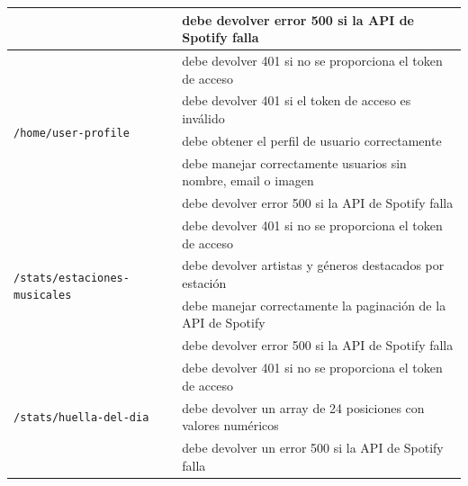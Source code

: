 \begin{longtable}{|p{5cm}|p{9cm}|}
                                                        & debe devolver error 500 si la API de Spotify falla                                       \\ \hline
  \multirow{5}{*}{\texttt{/home/user-profile}}          & debe devolver 401 si no se proporciona el token de acceso                                \\ \cline{2-2}
                                                        & debe devolver 401 si el token de acceso es inválido                                      \\ \cline{2-2}
                                                        & debe obtener el perfil de usuario correctamente                                          \\ \cline{2-2}
                                                        & debe manejar correctamente usuarios sin nombre, email o imagen                           \\ \cline{2-2}
                                                        & debe devolver error 500 si la API de Spotify falla                                       \\ \hline
  \multirow{4}{*}{\texttt{/stats/estaciones-musicales}} & debe devolver 401 si no se proporciona el token de acceso                                \\ \cline{2-2}
                                                        & debe devolver artistas y géneros destacados por estación                                 \\ \cline{2-2}
                                                        & debe manejar correctamente la paginación de la API de Spotify                            \\ \cline{2-2}
                                                        & debe devolver error 500 si la API de Spotify falla                                       \\ \hline
  \multirow{3}{*}{\texttt{/stats/huella-del-dia}}       & debe devolver 401 si no se proporciona el token de acceso                                \\ \cline{2-2}
                                                        & debe devolver un array de 24 posiciones con valores numéricos                            \\ \cline{2-2}
                                                        & debe devolver un error 500 si la API de Spotify falla                                    \\ \hline

\end{longtable}

